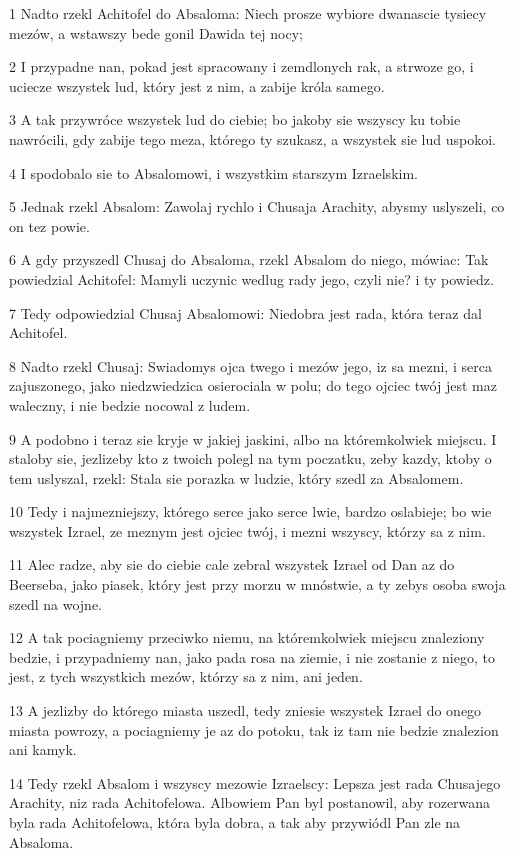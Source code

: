 \par 1 Nadto rzekl Achitofel do Absaloma: Niech prosze wybiore dwanascie tysiecy mezów, a wstawszy bede gonil Dawida tej nocy;
\par 2 I przypadne nan, pokad jest spracowany i zemdlonych rak, a strwoze go, i uciecze wszystek lud, który jest z nim, a zabije króla samego.
\par 3 A tak przywróce wszystek lud do ciebie; bo jakoby sie wszyscy ku tobie nawrócili, gdy zabije tego meza, którego ty szukasz, a wszystek sie lud uspokoi.
\par 4 I spodobalo sie to Absalomowi, i wszystkim starszym Izraelskim.
\par 5 Jednak rzekl Absalom: Zawolaj rychlo i Chusaja Arachity, abysmy uslyszeli, co on tez powie.
\par 6 A gdy przyszedl Chusaj do Absaloma, rzekl Absalom do niego, mówiac: Tak powiedzial Achitofel: Mamyli uczynic wedlug rady jego, czyli nie? i ty powiedz.
\par 7 Tedy odpowiedzial Chusaj Absalomowi: Niedobra jest rada, która teraz dal Achitofel.
\par 8 Nadto rzekl Chusaj: Swiadomys ojca twego i mezów jego, iz sa mezni, i serca zajuszonego, jako niedzwiedzica osierociala w polu; do tego ojciec twój jest maz waleczny, i nie bedzie nocowal z ludem.
\par 9 A podobno i teraz sie kryje w jakiej jaskini, albo na któremkolwiek miejscu. I staloby sie, jezlizeby kto z twoich polegl na tym poczatku, zeby kazdy, ktoby o tem uslyszal, rzekl: Stala sie porazka w ludzie, który szedl za Absalomem.
\par 10 Tedy i najmezniejszy, którego serce jako serce lwie, bardzo oslabieje; bo wie wszystek Izrael, ze meznym jest ojciec twój, i mezni wszyscy, którzy sa z nim.
\par 11 Alec radze, aby sie do ciebie cale zebral wszystek Izrael od Dan az do Beerseba, jako piasek, który jest przy morzu w mnóstwie, a ty zebys osoba swoja szedl na wojne.
\par 12 A tak pociagniemy przeciwko niemu, na któremkolwiek miejscu znaleziony bedzie, i przypadniemy nan, jako pada rosa na ziemie, i nie zostanie z niego, to jest, z tych wszystkich mezów, którzy sa z nim, ani jeden.
\par 13 A jezlizby do którego miasta uszedl, tedy zniesie wszystek Izrael do onego miasta powrozy, a pociagniemy je az do potoku, tak iz tam nie bedzie znalezion ani kamyk.
\par 14 Tedy rzekl Absalom i wszyscy mezowie Izraelscy: Lepsza jest rada Chusajego Arachity, niz rada Achitofelowa. Albowiem Pan byl postanowil, aby rozerwana byla rada Achitofelowa, która byla dobra, a tak aby przywiódl Pan zle na Absaloma.
